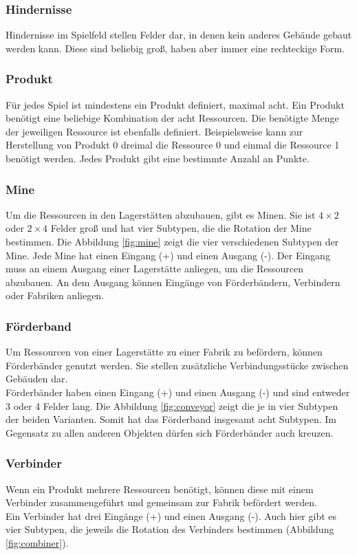 \subsubsection*{Hindernisse}
Hindernisse im Spielfeld stellen Felder dar, in denen kein anderes Gebäude gebaut werden kann. Diese sind beliebig groß, haben aber immer eine rechteckige Form. 

\subsubsection*{Produkt}
Für jedes Spiel ist mindestens ein Produkt definiert, maximal acht. Ein Produkt benötigt eine beliebige Kombination der acht Ressourcen. Die benötigte Menge der jeweiligen Ressource ist ebenfalls definiert. Beispielsweise kann zur Herstellung von Produkt 0 dreimal die Ressource 0 und einmal die Ressource 1 benötigt werden. Jedes Produkt gibt eine bestimmte Anzahl an Punkte.

\subsubsection*{Mine}
Um die Ressourcen in den Lagerstätten abzubauen, gibt es Minen. Sie ist $4\times2$ oder $2\times4$ Felder groß und hat vier Subtypen, die die Rotation der Mine bestimmen. Die Abbildung \ref{fig:mine} zeigt die vier verschiedenen Subtypen der Mine.
Jede Mine hat einen Eingang (+) und einen Ausgang (-). Der Eingang muss an einem Ausgang einer Lagerstätte anliegen, um die Ressourcen abzubauen. An dem Ausgang können Eingänge von Förderbändern, Verbindern oder Fabriken anliegen. 
\subsubsection*{Förderband}
Um Ressourcen von einer Lagerstätte zu einer Fabrik zu befördern, können Förderbänder genutzt werden. Sie stellen zusätzliche Verbindungsstücke zwischen Gebäuden dar.
\\
Förderbänder haben einen Eingang (+) und einen Ausgang (-) und sind entweder 3 oder 4 Felder lang. Die Abbildung \ref{fig:conveyor} zeigt die je in vier Subtypen der beiden Varianten. Somit hat das Förderband insgesamt acht Subtypen.
Im Gegensatz zu allen anderen Objekten dürfen sich Förderbänder auch kreuzen.

\subsubsection*{Verbinder}
Wenn ein Produkt mehrere Ressourcen benötigt, können diese mit einem Verbinder zusammengeführt und gemeinsam zur Fabrik befördert werden. 
\\
Ein Verbinder hat drei Eingänge (+) und einen Ausgang (-). Auch hier gibt es vier Subtypen, die jeweils die Rotation des Verbinders bestimmen (Abbildung \ref{fig:combiner}).

